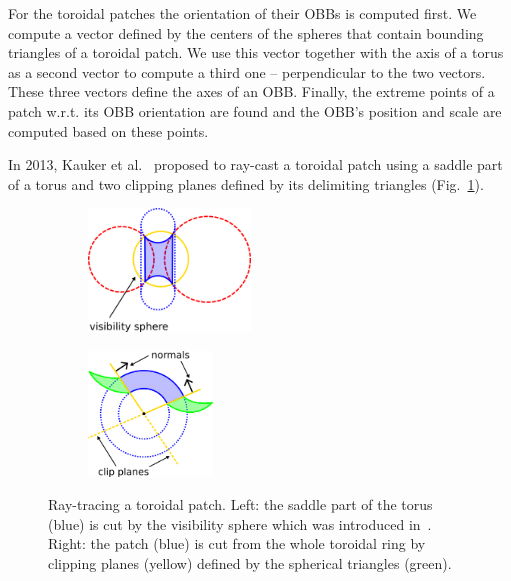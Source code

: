 For the toroidal patches the orientation of their OBBs is computed first.
We compute a vector defined by the centers of the spheres that contain bounding triangles of a toroidal patch.
We use this vector together with the axis of a torus as a second vector to compute a third one -- perpendicular to the two vectors.
These three vectors define the axes of an OBB.
Finally, the extreme points of a patch w.r.t. its OBB orientation are found and the OBB's position and scale are computed based on these points.

In 2013, Kauker et al.~\cite{kauker2013rendering} proposed to ray-cast a toroidal patch using a saddle part of a torus and two clipping planes defined by its delimiting triangles (Fig.~\ref{fig:torus}).
\begin{figure}[htp]
  \centering
  \begin{subfigure}[t]{0.55\columnwidth}
    \centering
    \includegraphics[width=1.7in]{image/torus-vs.png}
  \end{subfigure}%
  \quad
  \begin{subfigure}[t]{0.4\columnwidth}
    \centering
    \includegraphics[width=1.3in]{image/torus-planes.png}
  \end{subfigure}
	\caption{Ray-tracing a toroidal patch. Left: the saddle part of the torus (blue) is cut by the visibility sphere which was introduced in~\cite{krone2009interactive}.
  Right: the patch (blue) is cut from the whole toroidal ring by clipping planes (yellow) defined by the spherical triangles (green).}
	\label{fig:torus}
\end{figure}

